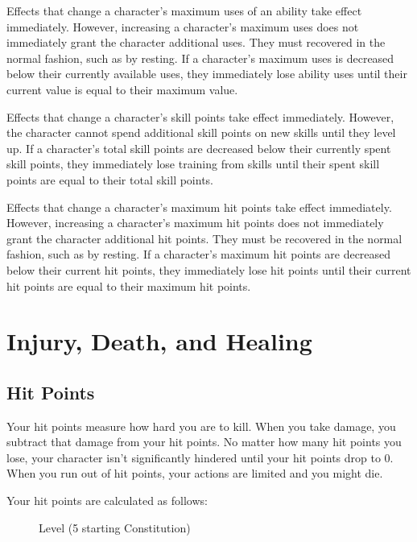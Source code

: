          Effects that change a character's maximum uses of an ability take effect immediately.
        However, increasing a character's maximum uses does not immediately grant the character additional uses.
        They must recovered in the normal fashion, such as by resting.
        If a character's maximum uses is decreased below their currently available uses, they immediately lose ability uses until their current value is equal to their maximum value.

         Effects that change a character's skill points take effect immediately.
        However, the character cannot spend additional skill points on new skills until they level up.
        If a character's total skill points are decreased below their currently spent skill points, they immediately lose training from skills until their spent skill points are equal to their total skill points.

         Effects that change a character's maximum hit points take effect immediately.
        However, increasing a character's maximum hit points does not immediately grant the character additional hit points.
        They must be recovered in the normal fashion, such as by resting.
        If a character's maximum hit points are decreased below their current hit points, they immediately lose hit points until their current hit points are equal to their maximum hit points.

\section{Injury, Death, and Healing}\label{Injury, Death, and Healing}

    \subsection{Hit Points}\label{Hit Points}
        Your hit points measure how hard you are to kill.
        When you take damage, you subtract that damage from your hit points.
        No matter how many hit points you lose, your character isn't significantly hindered until your hit points drop to 0.
        When you run out of hit points, your actions are limited and you might die.

        Your hit points are calculated as follows:

        \begin{figure}[h]
            \centering Level \x (5 \add starting Constitution)
        \end{figure}

